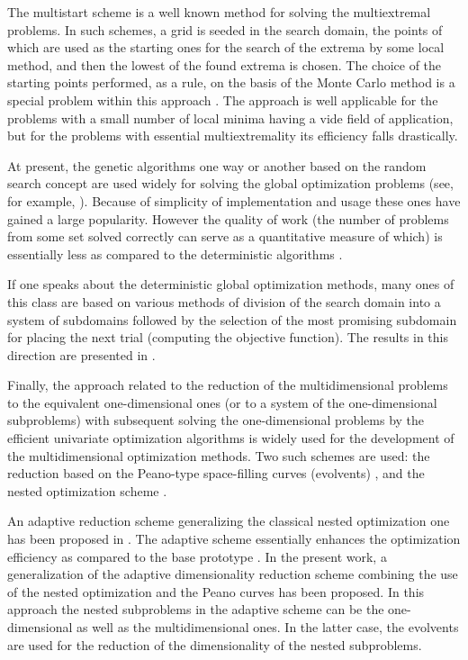 \documentclass[runningheads]{llncs}
\begin{document}
The multistart scheme is a well known method for solving the multiextremal problems.
In such schemes, a grid is seeded in the search domain, the points of which are used as the starting ones for the search of 
the extrema by some local method, and then the lowest of the found extrema is chosen. 
The choice of the starting points performed, as a rule, on the basis of the Monte Carlo method is a special problem within 
this approach \cite{Zhigljavsky2008}. 
The approach is well applicable for the problems with a small number of local minima having a vide field of application, 
but for the problems with essential multiextremality its efficiency falls drastically. 

At present, the genetic algorithms one way or another based on the random search concept are used widely for solving the 
global optimization problems (see, for example, \cite{Yang2013}). 
Because of simplicity of implementation and usage these ones have gained a large popularity. 
However the quality of work (the number of problems from some set solved correctly can serve as a quantitative measure 
of which) is essentially less as compared to the deterministic algorithms \cite{Kvasov2018,Sergeyev2018}.

If one speaks about the deterministic global optimization methods, many ones of this class are based on various methods 
of division of the search domain into a system of subdomains followed by the selection of the most promising subdomain 
for placing the next trial (computing the objective function). The results in this direction are presented in 
\cite{Evtushenko2013,Jones2009,Paulavicius2016,Zilinskas2010,Sergeyev2015}.

Finally, the approach related to the reduction of the multidimensional problems to the equivalent one-dimensional ones (or 
to a system of the one-dimensional subproblems) with subsequent solving the one-dimensional problems by the efficient 
univariate optimization algorithms is widely used for the development of the multidimensional 
optimization methods. Two such schemes are used: the reduction based on the Peano-type space-filling curves (evolvents) 
\cite{Sergeyev2013,Strongin2000}, and the nested optimization scheme \cite{Grishagin2001,Strongin2000}. 

An adaptive reduction scheme generalizing the classical nested optimization one has been proposed in 
\cite{Grishagin2016}. The adaptive scheme essentially enhances the optimization efficiency as compared to the base 
prototype \cite{Grishagin2016_1}. In the present work, a generalization of the adaptive dimensionality reduction scheme 
combining the use of the nested optimization and the Peano curves has been proposed. In this approach the nested 
subproblems in the adaptive scheme can be the one-dimensional as well as the multidimensional ones. In the latter case, 
the evolvents are used for the reduction of the dimensionality of the nested subproblems.
\end{document}
